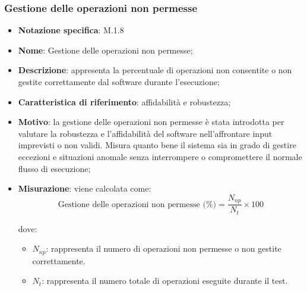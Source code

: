 \subsubsection{Gestione delle operazioni non permesse}
\begin{itemize}
    \item \textbf{Notazione specifica}: M.1.8
    \item \textbf{Nome}:  Gestione delle operazioni non permesse;
    \item \textbf{Descrizione}: appresenta la percentuale di operazioni non consentite o non gestite correttamente dal software durante l'esecuzione;
    \item \textbf{Caratteristica di riferimento}: affidabilità e robustezza;
    \item \textbf{Motivo}: la gestione delle operazioni non permesse è stata introdotta per valutare la robustezza e l'affidabilità del software nell'affrontare input imprevisti o non validi. Misura quanto bene il sistema sia in grado di gestire eccezioni e situazioni anomale senza interrompere o compromettere il normale flusso di esecuzione;
    \item \textbf{Misurazione}: viene calcolata come:
    \[
    \text{Gestione delle operazioni non permesse (\%)} = \frac{N_{np}}{N_{t}} \times 100
    \]
    
    dove:
    \begin{itemize}
        \item $N_{np}$: rappresenta il numero di operazioni non permesse o non gestite correttamente.
        \item $N_{t}$: rappresenta il numero totale di operazioni eseguite durante il test.
    \end{itemize}
\end{itemize}